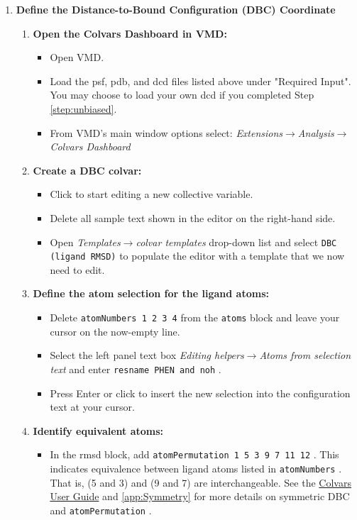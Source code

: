 \documentclass[9pt,tutorial]{Styling/livecoms}
\newcommand{\jh}[1]{\textcolor{blue}{JH: #1}}
\newcommand{\button}[1]{
  \inlineBox[gray]{\texttt{#1}}
}
\newcommand{\menu}[1]{
  \textit{#1}
}
\newcommand{\option}[1]{
  \texttt{#1}
}
\newcommand{\textInput}[1]{
  \texttt{#1}
}
\begin{document}
\begin{enumerate}
    \item \textbf{Define the Distance-to-Bound Configuration (DBC) Coordinate}
        \begin{enumerate}[label=\alph*., ref=\theenumi.\alph*]
             \item \textbf{Open the Colvars Dashboard in VMD:}
             \begin{itemize}
                \item Open VMD.
                 \item Load the psf, pdb, and dcd files listed above under "Required Input". You may choose to load your own dcd if you completed Step \ref{step:unbiased}.
                 \item From VMD's main window options select: \menu{Extensions$\rightarrow$Analysis$\rightarrow$Colvars Dashboard}
             \end{itemize}
             \item \textbf{Create a DBC colvar:}
             \begin{itemize}
                 \item Click \button{New [Ctrl-n]} to start editing a new collective variable.
                \item Delete all sample text shown in the editor on the right-hand side.
                \item Open \menu{Templates$\rightarrow$colvar templates} drop-down list and select \option{DBC (ligand RMSD)} to populate the editor with a template that we now need to edit.
            \end{itemize}
             \item \label{step:ligNumbers}\textbf{Define the atom selection for the ligand atoms:} 
             \begin{itemize}
                 \item Delete  \textInput{atomNumbers 1 2 3 4} from the \textInput{atoms} block and leave your cursor on the now-empty line.
                 \item Select the left panel text box \menu{Editing helpers$\rightarrow$Atoms from selection text} and enter \textInput{resname PHEN and noh}.
                 \item Press Enter or click \button{Insert [Enter]} to insert the new selection into the configuration text at your cursor.
            \end{itemize}
            \item \label{step:symmetry}\textbf{Identify equivalent atoms:} %
             \begin{itemize}
                 \item In the rmsd block, add \textInput{atomPermutation 1 5 3 9 7 11 12}. 
                 This indicates equivalence between ligand atoms listed in \textInput{atomNumbers}. That is, (5 and 3) and (9 and 7) are interchangeable. See the \href{https://colvars.github.io/colvars-refman-vmd/colvars-refman-vmd.html#sec:cvc_rmsd}{Colvars User Guide} and \ref{app:Symmetry} for more details on symmetric DBC and \textInput{atomPermutation}.
            \end{itemize}


\end{enumerate}
\end{enumerate}
\end{document}
